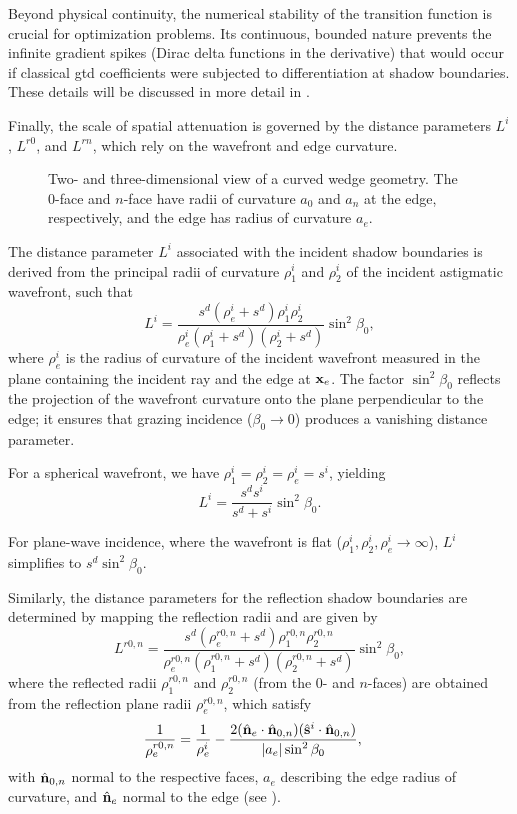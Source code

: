Beyond physical continuity, the numerical stability of the transition function is crucial for optimization problems. Its continuous, bounded nature prevents the infinite gradient spikes (Dirac delta functions in the derivative) that would occur if classical \gls{gtd} coefficients were subjected to differentiation at shadow boundaries. These details will be discussed in more detail in .

Finally, the scale of spatial attenuation is governed by the distance parameters $L^i$, $L^{r0}$, and $L^{rn}$, which rely on the wavefront and edge curvature.

\begin{figure}
  \centering
  \caption{Two- and three-dimensional view of a curved wedge geometry. The 0-face and $n$-face have radii of curvature $a_0$ and $a_n$ at the edge, respectively, and the edge has radius of curvature $a_e$.}
\end{figure}

The distance parameter $L^i$ associated with the incident shadow boundaries is derived from the principal radii of curvature $\rho_1^i$ and $\rho_2^i$ of the incident astigmatic wavefront, such that
\begin{equation}
  L^i = \frac{s^d(\rho_e^i + s^d)\rho_1^i\rho_2^i}{\rho_e^i(\rho_1^i + s^d)(\rho_2^i + s^d)}\sin^2\beta_0,
\end{equation}
where $\rho_e^i$ is the radius of curvature of the incident wavefront measured in the plane containing the incident ray and the edge at $\mathbf{x}_e$. The factor $\sin^2\beta_0$ reflects the projection of the wavefront curvature onto the plane perpendicular to the edge; it ensures that grazing incidence ($\beta_0 \to 0$) produces a vanishing distance parameter.

For a spherical wavefront, we have $\rho_1^i = \rho_2^i = \rho_e^i = s^i$, yielding
\begin{equation}
  L^i = \frac{s^d s^i}{s^d + s^i}\sin^2\beta_0.
\end{equation}

For plane-wave incidence, where the wavefront is flat ($\rho_1^i, \rho_2^i, \rho_e^i \to \infty$), $L^i$ simplifies to $s^d\sin^2\beta_0$.

Similarly, the distance parameters for the reflection shadow boundaries are determined by mapping the reflection radii and are given by
\begin{equation}
  L^{r0,n} = \frac{s^d(\rho_e^{r0,n} + s^d)\rho_1^{r0,n}\rho_2^{r0,n}}{\rho_e^{r0,n}(\rho_1^{r0,n} + s^d)(\rho_2^{r0,n} + s^d)}\sin^2\beta_0,
\end{equation}
where the reflected radii $\rho_1^{r0,n}$ and $\rho_2^{r0,n}$ (from the 0- and $n$-faces) are obtained from the reflection plane radii $\rho_e^{r0,n}$, which satisfy
\begin{align}
  \frac{1}{\rho_e^{r0,n}} &= \frac{1}{\rho_e^i} - \frac{2(\hat{\mathbf{n}}_e \cdot \hat{\mathbf{n}}_{0,n})(\hat{\mathbf{s}}^i \cdot \hat{\mathbf{n}}_{0,n})}{|a_e|\sin^2\beta_0},
\end{align}
with $\hat{\mathbf{n}}_{0,n}$ normal to the respective faces, $a_e$ describing the edge radius of curvature, and $\hat{\mathbf{n}}_e$ normal to the edge (see ).

